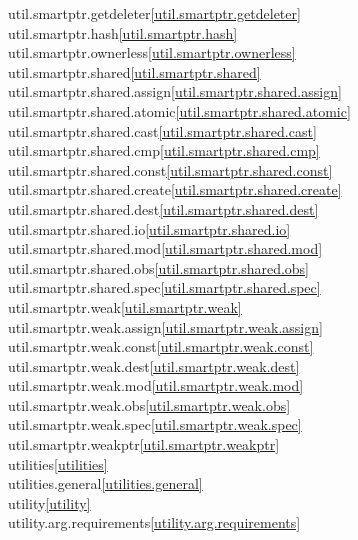 \begin{multicols}{2}
util.smartptr.getdeleter\quad\ref{util.smartptr.getdeleter}\\
util.smartptr.hash\quad\ref{util.smartptr.hash}\\
util.smartptr.ownerless\quad\ref{util.smartptr.ownerless}\\
util.smartptr.shared\quad\ref{util.smartptr.shared}\\
util.smartptr.shared.assign\quad\ref{util.smartptr.shared.assign}\\
util.smartptr.shared.atomic\quad\ref{util.smartptr.shared.atomic}\\
util.smartptr.shared.cast\quad\ref{util.smartptr.shared.cast}\\
util.smartptr.shared.cmp\quad\ref{util.smartptr.shared.cmp}\\
util.smartptr.shared.const\quad\ref{util.smartptr.shared.const}\\
util.smartptr.shared.create\quad\ref{util.smartptr.shared.create}\\
util.smartptr.shared.dest\quad\ref{util.smartptr.shared.dest}\\
util.smartptr.shared.io\quad\ref{util.smartptr.shared.io}\\
util.smartptr.shared.mod\quad\ref{util.smartptr.shared.mod}\\
util.smartptr.shared.obs\quad\ref{util.smartptr.shared.obs}\\
util.smartptr.shared.spec\quad\ref{util.smartptr.shared.spec}\\
util.smartptr.weak\quad\ref{util.smartptr.weak}\\
util.smartptr.weak.assign\quad\ref{util.smartptr.weak.assign}\\
util.smartptr.weak.const\quad\ref{util.smartptr.weak.const}\\
util.smartptr.weak.dest\quad\ref{util.smartptr.weak.dest}\\
util.smartptr.weak.mod\quad\ref{util.smartptr.weak.mod}\\
util.smartptr.weak.obs\quad\ref{util.smartptr.weak.obs}\\
util.smartptr.weak.spec\quad\ref{util.smartptr.weak.spec}\\
util.smartptr.weakptr\quad\ref{util.smartptr.weakptr}\\
utilities\quad\ref{utilities}\\
utilities.general\quad\ref{utilities.general}\\
utility\quad\ref{utility}\\
utility.arg.requirements\quad\ref{utility.arg.requirements}\\

\end{multicols}

